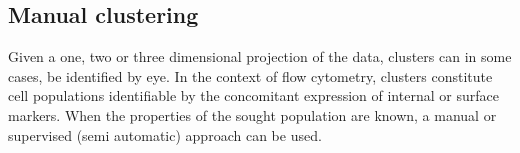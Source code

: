 
%

\subsection{Manual clustering}

Given a one, two or three dimensional projection of the data, clusters can in some cases, be identified by eye.
In the context of flow cytometry, clusters constitute cell populations identifiable by the concomitant expression of internal or surface markers.
When the properties of the sought population are known, a manual or supervised (semi automatic) approach can be used.

